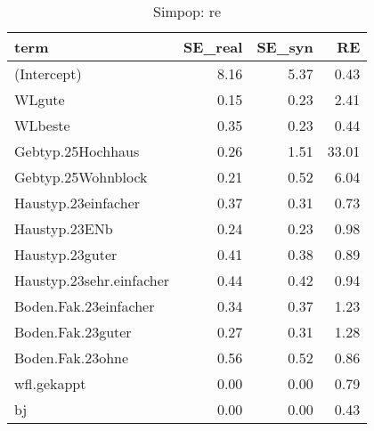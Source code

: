 \begin{table}[ht]
\centering
\begin{tabular}{lrrr}
  \hline
term & SE\_real & SE\_syn & RE \\ 
  \hline
(Intercept) & 8.16 & 5.37 & 0.43 \\ 
  WLgute & 0.15 & 0.23 & 2.41 \\ 
  WLbeste & 0.35 & 0.23 & 0.44 \\ 
  Gebtyp.25Hochhaus & 0.26 & 1.51 & 33.01 \\ 
  Gebtyp.25Wohnblock & 0.21 & 0.52 & 6.04 \\ 
  Haustyp.23einfacher & 0.37 & 0.31 & 0.73 \\ 
  Haustyp.23ENb & 0.24 & 0.23 & 0.98 \\ 
  Haustyp.23guter & 0.41 & 0.38 & 0.89 \\ 
  Haustyp.23sehr.einfacher & 0.44 & 0.42 & 0.94 \\ 
  Boden.Fak.23einfacher & 0.34 & 0.37 & 1.23 \\ 
  Boden.Fak.23guter & 0.27 & 0.31 & 1.28 \\ 
  Boden.Fak.23ohne & 0.56 & 0.52 & 0.86 \\ 
  wfl.gekappt & 0.00 & 0.00 & 0.79 \\ 
  bj & 0.00 & 0.00 & 0.43 \\ 
   \hline
\end{tabular}
\caption{Simpop: re} 
\end{table}
